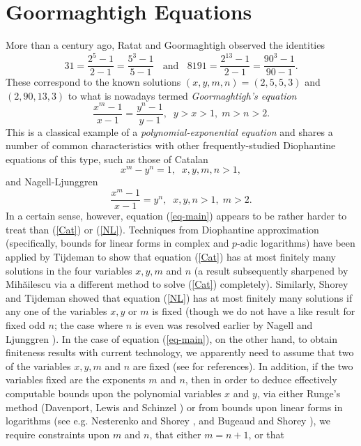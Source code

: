 
\chapter{Goormaghtigh Equations}
\label{ch:Goormaghtigh} 



More than a century ago, Ratat \cite{Ra} and Goormaghtigh \cite{Go} observed the identities
$$
31 = \frac{2^5-1}{2-1} = \frac{5^3-1}{5-1} \; \; \mbox{ and } \; \; 8191 = \frac{2^{13}-1}{2-1} = \frac{90^3-1}{90-1}.
$$
These correspond to the known solutions $(x,y,m,n)=(2,5,5,3)$ and $(2,90,13,3)$
to what is nowadays termed {\it Goormaghtigh's equation}
\begin{equation} \label{eq-main}
\frac{x^m-1}{x-1} = \frac{y^n-1}{y-1}, \; \; y>x>1, \; m > n > 2.
\end{equation}
This is a classical example of a {\it polynomial-exponential equation} and shares a number of common characteristics with other frequently-studied Diophantine equations of this type, such as those of 
Catalan
\begin{equation} \label{Cat}
x^m-y^n=1, \; \; x, y, m, n > 1,
\end{equation}
and 
Nagell-Ljunggren 
\begin{equation} \label{NL}
\frac{x^m-1}{x-1} = y^n, \; \; x, y, n >1, \; m > 2.
\end{equation}
In a certain sense, however, equation (\ref{eq-main}) appears to be rather harder to treat than (\ref{Cat}) or (\ref{NL}). Techniques from Diophantine approximation (specifically, bounds for linear forms in complex and $p$-adic logarithms) have been applied by Tijdeman \cite{Ti} to show that equation (\ref{Cat}) has at most finitely many solutions in the four variables $x,y, m$ and $n$ (a result subsequently sharpened by Mih{\u{a}}ilescu \cite{Mih} via a different method to solve (\ref{Cat}) completely). Similarly, Shorey and Tijdeman \cite{ShTi} showed that equation (\ref{NL}) has at most finitely many solutions if any one of the variables $x, y$ or $m$ is fixed (though we do not have a like result for fixed odd $n$; the case where $n$ is even was resolved earlier by Nagell \cite{Nag} and Ljunggren \cite{Lju}). In the case of equation (\ref{eq-main}), on the other hand, to obtain finiteness results with current technology, we apparently need to assume that two of the variables $x, y, m$ and $n$ are fixed (see \cite{BaSh} for references). In addition, if the two variables fixed are the exponents $m$ and $n$, then in order to deduce effectively computable bounds upon the polynomial variables $x$ and $y$, via either Runge's method (Davenport, Lewis and Schinzel \cite{DaLeSc}) or from bounds upon linear forms in logarithms (see e.g. Nesterenko and Shorey \cite{NeSh}, and Bugeaud and Shorey \cite{BuSh}), we require constraints upon $m$ and $n$, that either $m=n+1$, or that
